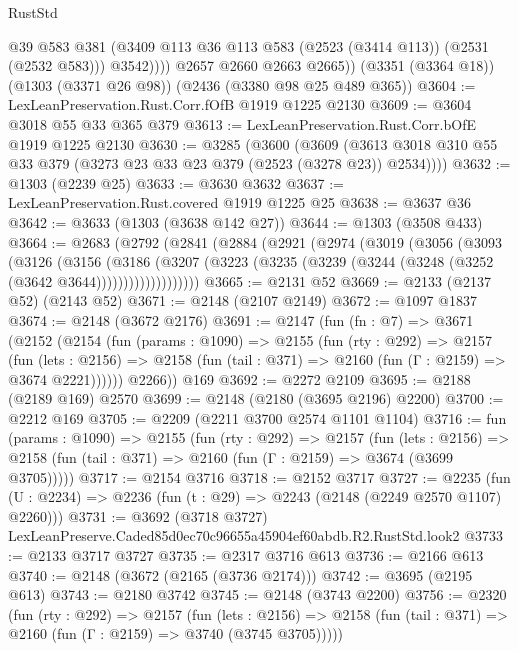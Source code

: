\begin{lexlean}{RustStd}
\begin{coremodule}
                @39
                @583
                @381
                (@3409 @113 @36 @113 @583 (@2523 (@3414 @113)) (@2531 (@2532 @583)))
                @3542))))
        @2657
        @2660
        @2663
        @2665))
    (@3351 (@3364 @18))
    (@1303 (@3371 @26 @98))
    (@2436 (@3380 @98 @25 @489 @365))
@3604 := LexLeanPreservation.Rust.Corr.fOfB @1919 @1225 @2130
@3609 := @3604 @3018 @55 @33 @365 @379
@3613 := LexLeanPreservation.Rust.Corr.bOfE @1919 @1225 @2130
@3630 := @3285
    (@3600
      (@3609 (@3613 @3018 @310 @55 @33 @379 (@3273 @23 @33 @23 @379 (@2523 (@3278 @23)) @2534))))
@3632 := @1303 (@2239 @25)
@3633 := @3630 @3632
@3637 := LexLeanPreservation.Rust.covered @1919 @1225 @25
@3638 := @3637 @36
@3642 := @3633 (@1303 (@3638 @142 @27))
@3644 := @1303 (@3508 @433)
@3664 := @2683
    (@2792
      (@2841
        (@2884
          (@2921
            (@2974
              (@3019
                (@3056
                  (@3093
                    (@3126
                      (@3156
                        (@3186
                          (@3207
                            (@3223
                              (@3235 (@3239 (@3244 (@3248 (@3252 (@3642 @3644)))))))))))))))))))
@3665 := @2131 @52
@3669 := @2133 (@2137 @52) (@2143 @52)
@3671 := @2148 (@2107 @2149)
@3672 := @1097 @1837
@3674 := @2148 (@3672 @2176)
@3691 := @2147
    (fun (fn : @7) =>
    @3671
      (@2152
        (@2154
          (fun (params : @1090) =>
          @2155
            (fun (rty : @292) =>
            @2157
              (fun (lets : @2156) =>
              @2158 (fun (tail : @371) => @2160 (fun (Γ : @2159) => @3674 @2221))))))
        @2266))
    @169
@3692 := @2272 @2109
@3695 := @2188 (@2189 @169) @2570
@3699 := @2148 (@2180 (@3695 @2196) @2200)
@3700 := @2212 @169
@3705 := @2209 (@2211 @3700 @2574 @1101 @1104)
@3716 := fun (params : @1090) =>
  @2155
    (fun (rty : @292) =>
    @2157
      (fun (lets : @2156) =>
      @2158 (fun (tail : @371) => @2160 (fun (Γ : @2159) => @3674 (@3699 @3705)))))
@3717 := @2154 @3716
@3718 := @2152 @3717
@3727 := @2235 (fun (U : @2234) => @2236 (fun (t : @29) => @2243 (@2148 (@2249 @2570 @1107) @2260)))
@3731 := @3692 (@3718 @3727) LexLeanPreserve.Caded85d0ec70c96655a45904ef60abdb.R2.RustStd.look2
@3733 := @2133 @3717 @3727
@3735 := @2317 @3716 @613
@3736 := @2166 @613
@3740 := @2148 (@3672 (@2165 (@3736 @2174)))
@3742 := @3695 (@2195 @613)
@3743 := @2180 @3742
@3745 := @2148 (@3743 @2200)
@3756 := @2320
    (fun (rty : @292) =>
    @2157
      (fun (lets : @2156) =>
      @2158 (fun (tail : @371) => @2160 (fun (Γ : @2159) => @3740 (@3745 @3705)))))

\end{coremodule}
\end{lexlean}
